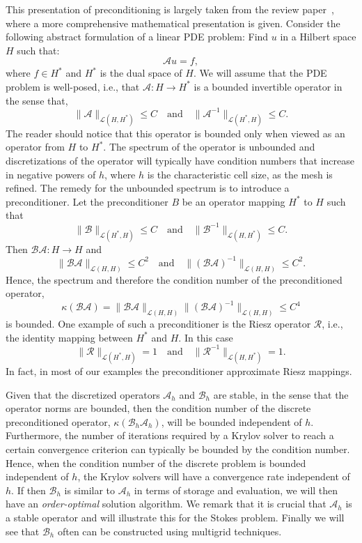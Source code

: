 This presentation of preconditioning is largely taken from the
review paper~\cite{M-W-09}, where a more comprehensive mathematical
presentation is given. Consider the following abstract formulation
of a linear PDE problem:  
Find $u$ in a Hilbert space $H$ such that: 
\[
\mathcal{A} u = f,  
\]
where $f\in H^*$ and $H^*$ is the dual space of $H$.  
We will assume that the PDE problem is well-posed, i.e., 
that $\mathcal{A} : H \rightarrow H^*$ is a bounded invertible operator in the sense that,  
\[
\|\mathcal{A}\|_{\mathcal{L} (H, H^*)} \le C \quad \mbox{and} \quad  
\|\mathcal{A}^{-1}\|_{\mathcal{L} (H^*, H)} \le C. 
\]
The reader should notice that this operator is bounded only when 
viewed as an operator from $H$ to $H^*$. 
The spectrum of the operator is unbounded and   
discretizations of the operator will typically have  
condition numbers that increase 
in negative powers of $h$, where $h$ is the
characteristic cell size, as the mesh is refined. 
The remedy for the unbounded spectrum is to introduce a preconditioner. 
Let the preconditioner $B$ be an operator
mapping $H^*$ to $H$ such that  
\[
\|\mathcal{B}\|_{\mathcal{L}(H^*, H)} \le C \quad \mbox{and} \quad   
\|\mathcal{B}^{-1}\|_{\mathcal{L}(H, H^*)} \le C. 
\]
Then 
$\mathcal{B}\mathcal{A}: H \rightarrow H$ and 
\[
\|\mathcal{B}\mathcal{A}\|_{\mathcal{L}(H, H)} \le C^2 \quad \mbox{and} \quad  
\|(\mathcal{B}\mathcal{A})^{-1}\|_{\mathcal{L}(H, H)} \le C^2. 
\]
Hence, the spectrum and therefore the condition number of the
preconditioned operator, 
\[
\kappa(\mathcal{B}\mathcal{A}) = \|\mathcal{B}\mathcal{A}\|_{\mathcal{L}(H, H)} \|(\mathcal{B}\mathcal{A})^{-1}\|_{\mathcal{L}(H, H)} \le C^4  
\]
is bounded.  One example of such a preconditioner is the Riesz operator $\mathcal{R}$, i.e.,  the identity mapping between $H^*$ and $H$.  
In this case 
\[
\|\mathcal{R}\|_{\mathcal{L}(H^*, H)} = 1 \quad \mbox{and} \quad   
\|\mathcal{R}^{-1}\|_{\mathcal{L}(H, H^*)} = 1. 
\]
In fact, in most of our examples the preconditioner approximate Riesz mappings.  

Given that the discretized operators  $\mathcal{A}_h$ and $\mathcal{B}_h$ are stable, in the sense
that the operator norms are bounded, then the condition number of the discrete preconditioned
operator, $\kappa(\mathcal{B}_h \mathcal{A}_h)$, will be bounded independent of $h$. 
Furthermore, the number of iterations required 
by a Krylov solver to reach a certain convergence criterion can typically be bounded by
the condition number. Hence, when the condition number of the discrete problem is bounded independent
of $h$, the Krylov solvers will have a convergence rate independent of $h$. 
If then $\mathcal{B}_h$ is similar to $\mathcal{A}_h$ in terms of storage and evaluation, 
we will then have an \emph{order-optimal} solution algorithm. 
We remark that it is crucial that $\mathcal{A}_h$
is a stable operator and will illustrate this for the Stokes problem. 
Finally we will see that $\mathcal{B}_h$ often can be constructed 
using multigrid techniques. 

